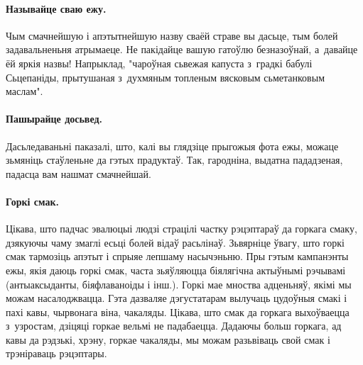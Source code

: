 \paragraph{Называйце сваю ежу.}
Чым смачнейшую і апэтытнейшую назву сваёй страве вы дасьце, тым болей задавальненьня атрымаеце. Не пакідайце вашую гатоўлю безназоўнай, а~давайце ёй яркія назвы! Напрыклад, "чароўная сьвежая капуста з~градкі бабулі Сьцепаніды, прытушаная з~духмяным топленым вясковым сьметанковым маслам".

\paragraph{Пашырайце досьвед.}
Дасьледаваньні паказалі, што, калі вы глядзіце прыгожыя фота ежы, можаце зьмяніць стаўленьне да гэтых прадуктаў. Так, гародніна, выдатна пададзеная, падасца вам нашмат смачнейшай.

\paragraph{Горкі смак.}
Цікава, што падчас эвалюцыі людзі страцілі частку рэцэптараў да горкага смаку, дзякуючы чаму змаглі есьці болей відаў расьлінаў. Зьвярніце ўвагу, што горкі смак тармозіць апэтыт і спрыяе лепшаму насычэньню. Пры гэтым кампанэнты ежы, якія даюць горкі смак, часта зьяўляюцца біялягічна актыўнымі рэчывамі (антыаксыданты, біяфлаваноіды і інш.). Горкі мае мноства адценьняў, якімі мы можам насалоджвацца. Гэта дазваляе дэгустатарам вылучаць цудоўныя смакі і пахі кавы, чырвонага віна, чакаляды. Цікава, што смак да горкага выхоўваецца з~узростам, дзіцяці горкае вельмі не падабаецца. Дадаючы больш горкага, ад кавы да рэдзькі, хрэну, горкае чакаляды, мы можам разьвіваць свой смак і трэніраваць рэцэптары.
